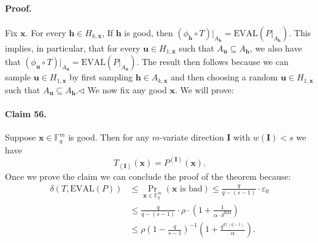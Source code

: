 \documentclass[10pt,a4paper]{article}
\begin{document}
\paragraph{Proof.} Fix $\boldsymbol x$. For every $\boldsymbol h\in H_{k,\boldsymbol x}$, If $\boldsymbol h$ is good, then $(\phi_{\boldsymbol h}\circ T)|_{A_{\boldsymbol h}}=\mathrm{EVAL}(P|_{A_{\boldsymbol h}})$. This implies, in particular, that for every $\boldsymbol u\in H_{1,\boldsymbol x}$ such that $A_{\boldsymbol u}\subseteq A_{\boldsymbol h}$, we also have that $(\phi_{\boldsymbol u}\circ T)|_{A_{\boldsymbol u}}=\mathrm{EVAL}(P|_{A_{\boldsymbol u}})$. The result then follows because we can sample $\boldsymbol u\in H_{1,\boldsymbol x}$ by first sampling $\boldsymbol h\in A_{k,\boldsymbol x}$ and then choosing a random $\boldsymbol u\in H_{1,\boldsymbol x}$ such that $A_{\boldsymbol u}\subseteq A_{\boldsymbol h}$.\hfill$\triangleleft$
We now fix any good $\boldsymbol x$. We will prove:
\paragraph{Claim 56.} Suppose $\boldsymbol x\in\mathbb F_q^m$ is good. Then for any $m$-variate direction $\boldsymbol I$ with $w(\boldsymbol I)<s$ we have
\[T_{(\boldsymbol I)}(\boldsymbol x)=P^{(\boldsymbol I)}(\boldsymbol x).\tag{10}\]
Once we prove the claim we can conclude the proof of the theorem because:
\begin{align*}
\delta(T,\mathrm{EVAL}(P))&\leq\Pr_{\boldsymbol x\in\mathbb F_q^m}(\boldsymbol x\text{ is bad})\leq\frac q{q-(s-1)}\cdot\varepsilon_0\\
&\leq\frac q{q-(s-1)}\cdot\rho\cdot\left(1+\frac1{\alpha\cdot\delta^{\mathrm{RM}}}\right)\\
&\leq\rho\left(1-\frac q{s-1}\right)^{-1}\left(1+\frac{q^{d/(q-1)}}\alpha\right).
\end{align*}
\end{document}
